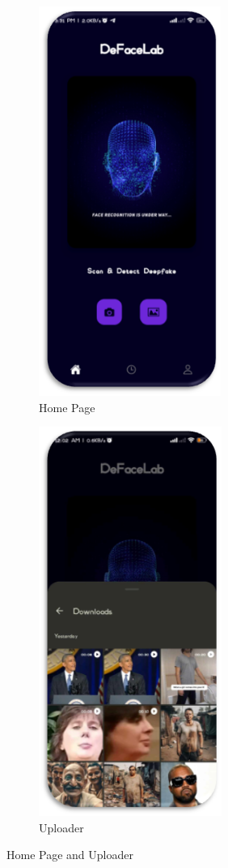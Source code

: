 \begin{figure}[ht]
    \centering
    \begin{subfigure}[b]{0.45\textwidth}
        \centering
        \includegraphics[height=5in]{img/Homepage.png}
        \caption{{Home Page}}
    \end{subfigure}
    \hfill
    \begin{subfigure}[b]{0.45\textwidth}
        \centering
        \includegraphics[height=5in]{img/uploaderv3.png}
        \caption{{Uploader}}
    \end{subfigure}
    \caption{Home Page and Uploader}
\end{figure}


